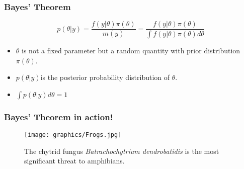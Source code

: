 \documentclass{beamer}
\newcommand{\1}{\ensuremath{\mathbf{1}}}
\begin{document}
%
%
%
\begin{frame}\frametitle{Bayes’ Theorem}
	\begin{block}{}
		\begin{equation}
			p(\theta|y) = \frac{f (y|\theta)\pi(\theta)}{m(y)} = \frac{f (y|\theta)\pi(\theta)}{\int f (y|\theta)\pi(\theta)d\theta}
		\end{equation}
	\end{block}
	\begin{itemize}
		\item $\theta$ is not a fixed parameter but a random quantity with prior distribution $\pi(\theta)$.
		\item $p(\theta|y) $is the posterior probability distribution of $\theta$.
		\item $\int p(\theta|y) d\theta = 1$
	\end{itemize}
\end{frame}
%
%
%
\begin{frame}\frametitle{Bayes’ Theorem in action!}
	\begin{figure}
	\begin{center}
		\texttt{[image: graphics/Frogs.jpg]}
	\end{center}
	\caption{The chytrid fungus \emph{Batrachochytrium dendrobatidis} is the most significant threat to amphibians.}
	\end{figure}
\end{frame}
%
%
%
\end{document}
